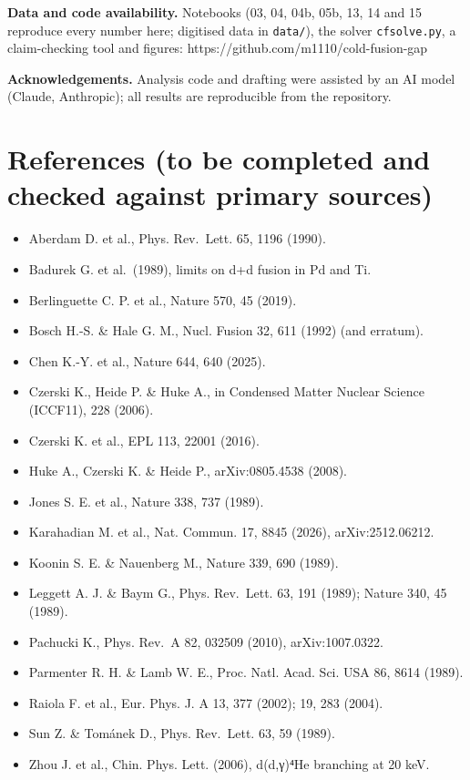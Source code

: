 \documentclass[
]{article}
\providecommand{\tightlist}{%
  \setlength{\itemsep}{0pt}\setlength{\parskip}{0pt}}
\begin{document}
\textbf{Data and code availability.} Notebooks (03, 04, 04b, 05b, 13, 14
and 15 reproduce every number here; digitised data in \texttt{data/}),
the solver \texttt{cfsolve.py}, a claim-checking tool and figures:
https://github.com/m1110/cold-fusion-gap

\textbf{Acknowledgements.} Analysis code and drafting were assisted by
an AI model (Claude, Anthropic); all results are reproducible from the
repository.

\hypertarget{references-to-be-completed-and-checked-against-primary-sources}{%
\section{References (to be completed and checked against primary
sources)}\label{references-to-be-completed-and-checked-against-primary-sources}}

\begin{itemize}
\tightlist
\item
  Aberdam D. et al., Phys. Rev.~Lett. 65, 1196 (1990).
\item
  Badurek G. et al.~(1989), limits on d+d fusion in Pd and Ti.
\item
  Berlinguette C. P. et al., Nature 570, 45 (2019).
\item
  Bosch H.-S. \& Hale G. M., Nucl. Fusion 32, 611 (1992) (and erratum).
\item
  Chen K.-Y. et al., Nature 644, 640 (2025).
\item
  Czerski K., Heide P. \& Huke A., in Condensed Matter Nuclear Science
  (ICCF11), 228 (2006).
\item
  Czerski K. et al., EPL 113, 22001 (2016).
\item
  Huke A., Czerski K. \& Heide P., arXiv:0805.4538 (2008).
\item
  Jones S. E. et al., Nature 338, 737 (1989).
\item
  Karahadian M. et al., Nat. Commun. 17, 8845 (2026), arXiv:2512.06212.
\item
  Koonin S. E. \& Nauenberg M., Nature 339, 690 (1989).
\item
  Leggett A. J. \& Baym G., Phys. Rev.~Lett. 63, 191 (1989); Nature 340,
  45 (1989).
\item
  Pachucki K., Phys. Rev.~A 82, 032509 (2010), arXiv:1007.0322.
\item
  Parmenter R. H. \& Lamb W. E., Proc. Natl. Acad. Sci. USA 86, 8614
  (1989).
\item
  Raiola F. et al., Eur. Phys. J. A 13, 377 (2002); 19, 283 (2004).
\item
  Sun Z. \& Tománek D., Phys. Rev.~Lett. 63, 59 (1989).
\item
  Zhou J. et al., Chin. Phys. Lett. (2006), d(d,γ)⁴He branching at 20
  keV.
\end{itemize}
\end{document}
